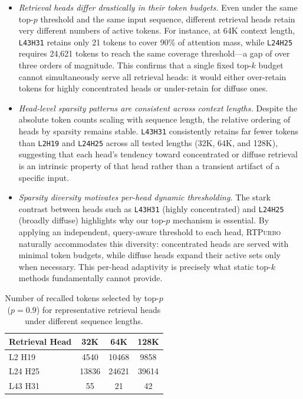 \documentclass{llmxive}
\providecommand{\name}{{\textsc{RTPurbo}}\xspace}
\begin{document}
\begin{itemize}[leftmargin=*, itemindent=0pt]
    \item \emph{Retrieval heads differ drastically in their token budgets.} 
    Even under the same top-$p$ threshold and the same input sequence, different 
    retrieval heads retain very different numbers of active tokens. For instance, 
    at 64K context length, \texttt{L43H31} retains only 21 tokens to cover 90\% 
    of attention mass, while \texttt{L24H25} requires 24{,}621 tokens to reach 
    the same coverage threshold---a gap of over three orders of magnitude. This 
    confirms that a single fixed top-$k$ budget cannot simultaneously serve all 
    retrieval heads: it would either over-retain tokens for highly concentrated 
    heads or under-retain for diffuse ones.

    \item \emph{Head-level sparsity patterns are consistent across context lengths.}
    Despite the absolute token counts scaling with sequence length, the relative 
    ordering of heads by sparsity remains stable. \texttt{L43H31} consistently 
    retains far fewer tokens than \texttt{L2H19} and \texttt{L24H25} across all 
    tested lengths (32K, 64K, and 128K), suggesting that each head's tendency 
    toward concentrated or diffuse retrieval is an intrinsic property of that head 
    rather than a transient artifact of a specific input.

    \item \emph{Sparsity diversity motivates per-head dynamic thresholding.}
    The stark contrast between heads such as \texttt{L43H31} (highly concentrated) 
    and \texttt{L24H25} (broadly diffuse) highlights why our top-$p$ mechanism 
    is essential. By applying an independent, query-aware threshold to each head, 
    \name naturally accommodates this diversity: concentrated heads are served 
    with minimal token budgets, while diffuse heads expand their active sets only 
    when necessary. This per-head adaptivity is precisely what static top-$k$ 
    methods fundamentally cannot provide.
\end{itemize}

\begin{table}[ht]
    \centering
    \small
    \begin{tabular}{lccc}
        \toprule
        \textbf{Retrieval Head} & \textbf{32K} & \textbf{64K} & \textbf{128K} \\
        \midrule
        L2 H19  & 4540 & 10468 & 9858 \\
        L24 H25 & 13836 & 24621 & 39614 \\
        L43 H31 & 55 & 21 & 42 \\
        \bottomrule
    \end{tabular}
\caption{Number of recalled tokens selected by top-$p$ ($p=0.9$) for representative retrieval heads under different sequence lengths.}
\label{tab:appendix_headwise_topp_tokens}
\end{table}
\end{document}
